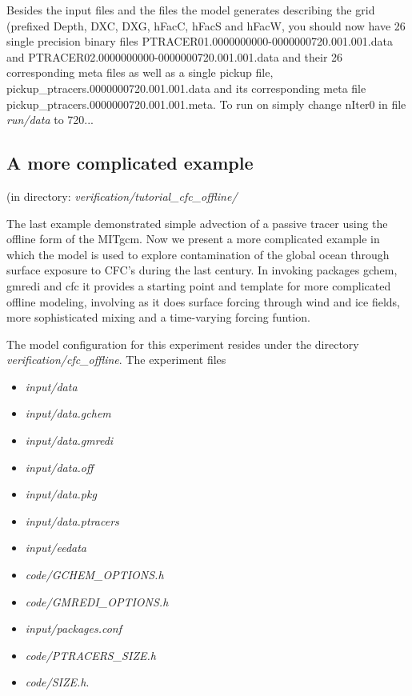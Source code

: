 Besides the input files and the files the model generates describing
the grid (prefixed Depth, DXC, DXG, hFacC, hFacS and hFacW, you should
now have 26 single precision binary files
PTRACER01.0000000000-0000000720.001.001.data and
PTRACER02.0000000000-0000000720.001.001.data and their 26
corresponding meta files as well as a single pickup file,
pickup\_ptracers.0000000720.001.001.data and its corresponding meta
file pickup\_ptracers.0000000720.001.001.meta. To run on simply change
nIter0 in file {\it run/data} to 720...

\subsection{A more complicated example}
\label{sect:eg-offline-cfc}
\begin{center}
(in directory: {\it verification/tutorial\_cfc\_offline/}\\
\end{center}

\noindent The last example demonstrated simple advection of a passive
tracer using the offline form of the MITgcm. Now we present a more
complicated example in which the model is used to explore
contamination of the global ocean through surface exposure to CFC's
during the last century. In invoking packages gchem, gmredi and cfc it
provides a starting point and template for more complicated offline
modeling, involving as it does surface forcing through wind and ice
fields, more sophisticated mixing and a time-varying forcing funtion.

\vspace{0.5cm}

\noindent The model configuration for this experiment resides under
the directory {\it verification/cfc\_offline}.  The experiment files

\begin{itemize}
\item {\it input/data}
\item {\it input/data.gchem}
\item {\it input/data.gmredi}
\item {\it input/data.off}
\item {\it input/data.pkg}
\item {\it input/data.ptracers}
\item {\it input/eedata}
\item {\it code/GCHEM\_OPTIONS.h}
\item {\it code/GMREDI\_OPTIONS.h}
\item {\it input/packages.conf}
\item {\it code/PTRACERS\_SIZE.h}
\item {\it code/SIZE.h}. 
\end{itemize}

